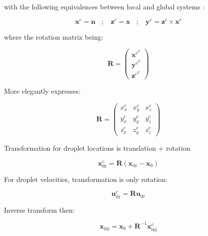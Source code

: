 with the following equivalences between local and global systems :

\begin{equation}
\boldsymbol{x}^c = \boldsymbol{n}  ~~~~ ; ~~~~ \boldsymbol{z}^c = \boldsymbol{x}  ~~~~ ; ~~~~ \boldsymbol{y}^c =  \boldsymbol{z}^c \times \boldsymbol{x}^c
\end{equation}

where the rotation matrix being:

\begin{equation}
\boldsymbol{R} = \begin{pmatrix} \boldsymbol{x}^{c^T} \\ \boldsymbol{y}^{c^T} \\ \boldsymbol{z}^{c^T} \end{pmatrix}
\end{equation}

More elegantly expresses:

\begin{equation}
\boldsymbol{R} = \begin{pmatrix} x^c_x & x^c_y & x^c_z \\ y^c_x & y^c_y & y^c_z \\ z^c_x & z^c_y & z^c_z \end{pmatrix}
\end{equation}



Transformation for droplet locations is translation + rotation

\begin{equation}
\boldsymbol{x}^c_\mathrm{dr} = \boldsymbol{R} \left( \boldsymbol{x}_\mathrm{dr} -  \boldsymbol{x}_0 \right)
\end{equation}

For droplet velocities, transformation is only rotation:

\begin{equation}
\boldsymbol{u}^c_\mathrm{dr} = \boldsymbol{R} \boldsymbol{u}_\mathrm{dr}
\end{equation}

Inverse transform then:

\begin{equation}
\boldsymbol{x}_\mathrm{inj} = \boldsymbol{x}_0 + \boldsymbol{R}^{-1} \boldsymbol{x}_\mathrm{inj}^c
\end{equation}

